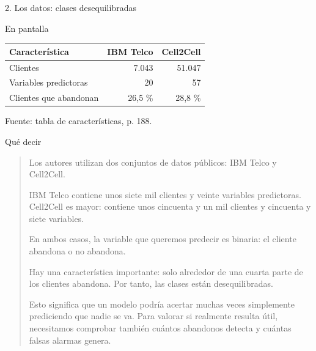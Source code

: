 \documentclass[presentation]{beamer}
\begin{document}
\begin{frame}[label={sec:org1fa296e}]{2. Los datos: clases desequilibradas}
\begin{block}{En pantalla}
\begin{center}
\begin{tabular}{lrr}
Característica & IBM Telco & Cell2Cell\\
\hline
Clientes & 7.043 & 51.047\\
Variables predictoras & 20 & 57\\
Clientes que abandonan & 26,5 \% & 28,8 \%\\
\end{tabular}
\end{center}

Fuente: tabla de características, p. 188.
\end{block}
\begin{block}{Qué decir}
\begin{quote}
Los autores utilizan dos conjuntos de datos públicos: IBM Telco y
Cell2Cell.

IBM Telco contiene unos siete mil clientes y veinte variables
predictoras. Cell2Cell es mayor: contiene unos cincuenta y un mil
clientes y cincuenta y siete variables.

En ambos casos, la variable que queremos predecir es binaria: el
cliente abandona o no abandona.

Hay una característica importante: solo alrededor de una cuarta parte
de los clientes abandona. Por tanto, las clases están desequilibradas.

Esto significa que un modelo podría acertar muchas veces simplemente
prediciendo que nadie se va. Para valorar si realmente resulta útil,
necesitamos comprobar también cuántos abandonos detecta y cuántas
falsas alarmas genera.
\end{quote}
\end{block}
\end{frame}
\end{document}

